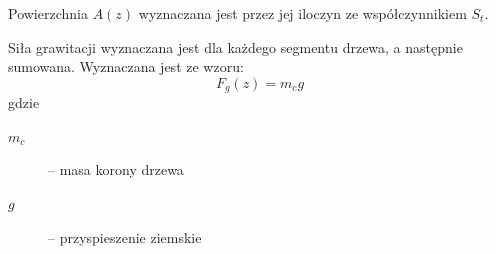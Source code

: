 \documentclass[a4paper,12pt]{article}
\begin{document}
Powierzchnia $A(z)$ wyznaczana jest przez jej iloczyn ze współczynnikiem $S_t$.

Siła grawitacji wyznaczana jest dla każdego segmentu drzewa, a następnie sumowana. Wyznaczana jest ze wzoru:
$$F_g(z) = m_c g$$
gdzie
\begin{description}
  \item[$m_c$] -- masa korony drzewa
  \item[$g$] -- przyspieszenie ziemskie
\end{description}








\clearpage
{}

\end{document}
